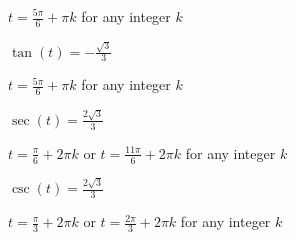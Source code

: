 \documentclass{ximera}
\begin{document}
\begin{question}
\begin{problem}
\begin{solution}
$t = \frac{5\pi}{6} + \pi k$ for any integer $k$
\end{solution}
\end{problem}

\begin{problem}
$\tan(t) = -\frac{\sqrt{3}}{3}$

\begin{solution}
$t = \frac{5\pi}{6} + \pi k$ for any integer $k$
\end{solution}
\end{problem}

\begin{problem}
$\sec(t) = \frac{2\sqrt{3}}{3}$

\begin{solution}
 $t = \frac{\pi}{6} + 2\pi k$ or $t = \frac{11\pi}{6} + 2\pi k$ for any integer $k$
\end{solution}
\end{problem}

\begin{problem} \label{circequtlast}
$\csc(t) = \frac{2\sqrt{3}}{3}$ 

\begin{solution}
$t = \frac{\pi}{3} + 2\pi k$ or $t = \frac{2\pi}{3} + 2\pi k$ for any integer $k$
\end{solution}
\end{problem}

\end{question}
\end{document}
